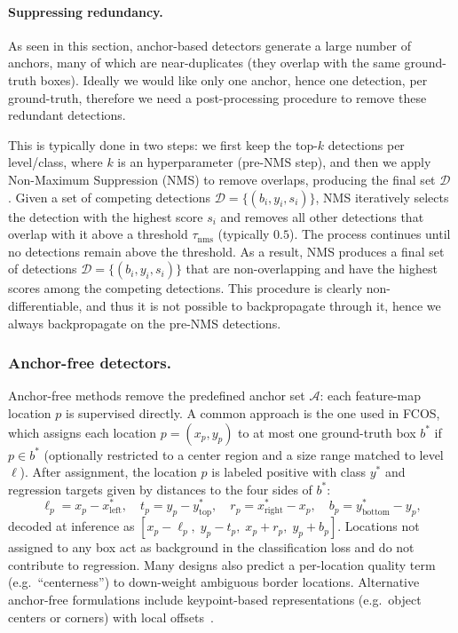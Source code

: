 \paragraph{Suppressing redundancy.}
As seen in this section, anchor-based detectors generate a large number of anchors, many of which are near-duplicates (they overlap with the same ground-truth boxes). Ideally we would like only one anchor, hence one detection, per ground-truth, therefore we need a post-processing procedure to remove these redundant detections.

This is typically done in two steps: we first keep the top-$k$ detections per level/class, where $k$ is an hyperparameter (pre-NMS step), and then we apply Non-Maximum Suppression (NMS) to remove overlaps, producing the final set $\mathcal{D}$ \cite{neubeck2006efficient}.
Given a set of competing detections $\mathcal{D} = \{(b_i, y_i, s_i)\}$, NMS iteratively selects the detection with the highest score $s_i$ and removes all other detections that overlap with it above a threshold $\tau_{\text{nms}}$ (typically $0.5$). The process continues until no detections remain above the threshold.
As a result, NMS produces a final set of detections $\mathcal{D} = \{(b_i, y_i, s_i)\}$ that are non-overlapping and have the highest scores among the competing detections.
This procedure is clearly non-differentiable, and thus it is not possible to backpropagate through it, hence we always backpropagate on the pre-NMS detections.


\subsubsection{Anchor-free detectors.}
Anchor-free methods remove the predefined anchor set $\mathcal{A}$: each feature-map location $p$ is supervised directly.
A common approach is the one used in FCOS, which assigns each location $p=(x_p, y_p)$ to at most one ground-truth box $b^\ast$ if $p \in b^\ast$ (optionally restricted to a center region and a size range matched to level $\ell$).
After assignment, the location $p$ is labeled positive with class $y^\ast$ and regression targets given by distances to the four sides of $b^\ast$:
$$
\ell_p = x_p - x^\ast_{\text{left}},\quad
t_p = y_p - y^\ast_{\text{top}},\quad
r_p = x^\ast_{\text{right}} - x_p,\quad
b_p = y^\ast_{\text{bottom}} - y_p,
$$
decoded at inference as $[x_p-\ell_p,\; y_p-t_p,\; x_p+r_p,\; y_p+b_p]$.
Locations not assigned to any box act as background in the classification loss and do not contribute to regression.
Many designs also predict a per-location quality term (e.g.\ ``centerness'') to down-weight ambiguous border locations. 
Alternative anchor-free formulations include keypoint-based representations (e.g.\ object centers or corners) with local offsets~\cite{tian2019fcos,law2019cornernet,duan2019centernet}.\\

